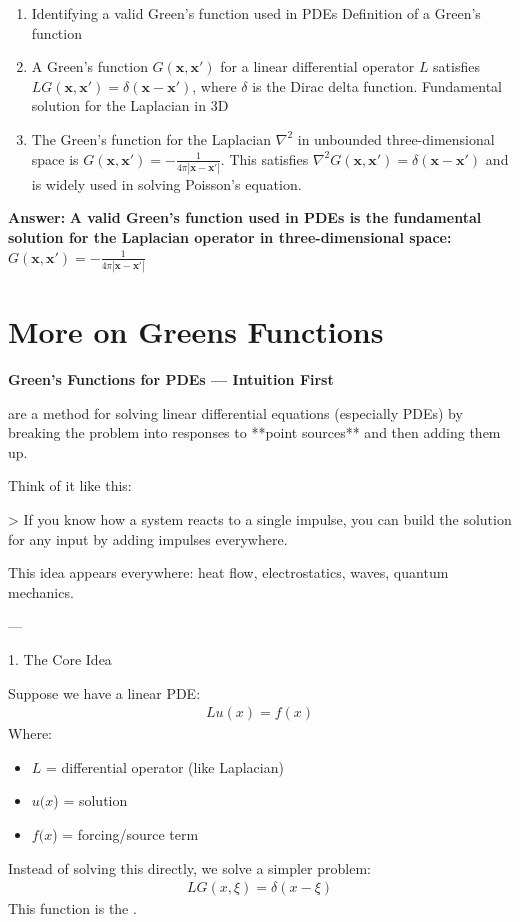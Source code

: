 \documentclass[12pt,a4paper]{report}
\begin{document}
{\begin{description}
\begin{enumerate}
\item Identifying a valid Green's function used in PDEs
Definition of a Green's function
\item A Green's function \(G(\mathbf{x}, \mathbf{x}')\) for a linear differential operator \(L\) satisfies \(L G(\mathbf{x}, \mathbf{x}') = \delta(\mathbf{x} - \mathbf{x}')\), where \(\delta\) is the Dirac delta function.
Fundamental solution for the Laplacian in 3D
\item The Green's function for the Laplacian \(\nabla^2\) in unbounded three-dimensional space is \(G(\mathbf{x}, \mathbf{x}') = -\frac{1}{4\pi |\mathbf{x} - \mathbf{x}'|}\). This satisfies \(\nabla^2 G(\mathbf{x}, \mathbf{x}') = \delta(\mathbf{x} - \mathbf{x}')\) and is widely used in solving Poisson's equation.

\end{enumerate}
\textbf{Answer:} \textbf{A valid Green's function used in PDEs is the fundamental solution for the Laplacian operator in three-dimensional space: \(G(\mathbf{x}, \mathbf{x}') = -\frac{1}{4\pi |\mathbf{x} - \mathbf{x}'|}\)}

\end{description}

\newpage
\section*{More on Greens Functions}

\textbf{Green’s Functions for PDEs — Intuition First}

 are a method for solving linear differential equations (especially PDEs) by breaking the problem into responses to **point sources** and then adding them up.

Think of it like this:

> If you know how a system reacts to a single impulse, you can build the solution for any input by adding impulses everywhere.

This idea appears everywhere: heat flow, electrostatics, waves, quantum mechanics.

---

\begin{description}

\item 1. The Core Idea

Suppose we have a linear PDE:
\begin{align*}
L u(x) = f(x)
\end{align*} Where:
\begin{itemize}
\item $L$ = differential operator (like Laplacian)
\item $u(x$) = solution
\item $f(x$) = forcing/source term
\end{itemize}
Instead of solving this directly, we solve a simpler problem:
\begin{align*}
L G(x,\xi) = \delta(x-\xi)
\end{align*}
This function  is the .


\end{description}}
\end{document}

